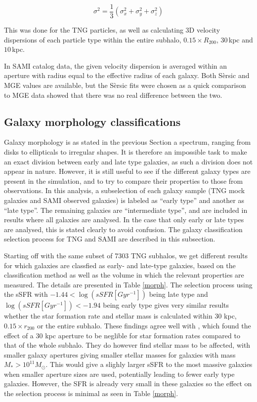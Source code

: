 \begin{equation} \label{sigma1}
    \sigma^{2} = \frac{1}{3}(\sigma_x^2 + \sigma_y^2 + \sigma_z^2)
\end{equation}

This was done for the TNG particles, as well as calculating 3D velocity dispersions of each particle type within the entire subhalo, $0.15 \times R_{200}$, $30\,$kpc and $10\,$kpc.

In SAMI catalog data, the given velocity dispersion is averaged within an aperture with radius equal to the effective radius of each galaxy. Both Sèrsic and MGE values are available, but the Sèrsic fits were chosen as a quick comparison to MGE data showed that there was no real difference between the two.

\subsection{Galaxy morphology classifications}

Galaxy morphology is as stated in the previous Section a spectrum, ranging from disks to ellipticals to irregular shapes. It is therefore an impossible task to make an exact division between early and late type galaxies, as such a division does not appear in nature. However, it is still useful to see if the different galaxy types are present in the simulation, and to try to compare their properties to those from observations. In this analysis, a subselection of each galaxy sample (TNG mock galaxies and SAMI observed galaxies) is labeled as ``early type'' and another as ``late type''. The remaining galaxies are ``intermediate type'', and are included in results where all galaxies are analysed. In the case that only early or late types are analysed, this is stated clearly to avoid confusion. The galaxy classification selection process for TNG and SAMI are described in this subsection.

Starting off with the same subset of 7303 TNG subhalos, we get different results for which galaxies are classfied as early- and late-type galaxies, based on the classification method as well as the volume in which the relevant properties are measured. The details are presented in Table \ref{morph}. The selection process using the sSFR with $ -1.44 < \log (sSFR[Gyr^{-1}]) $ being late type and $\log (sSFR[Gyr^{-1}]) < -1.94$ being early type gives very similar results whether the star formation rate and stellar mass is calculated within 30 kpc, $0.15 \times r_{200}$ or the entire subhalo. These findings agree well with \textcite{Schaye2015}, which found the effect of a 30 kpc aperture to be neglible for star formation rates compared to that of the whole subhalo. They do however find stellar mass to be affected, with smaller galaxy apertures giving smaller stellar masses for galaxies with mass $M_* > 10^{11}M_{\odot}$. This would give a slighly larger sSFR to the most massive galaxies when smaller aperture sizes are used, potentially leading to fewer early type galaxies. However, the SFR is already very small in these galaxies so the effect on the selection process is minimal as seen in Table \ref{morph}.

